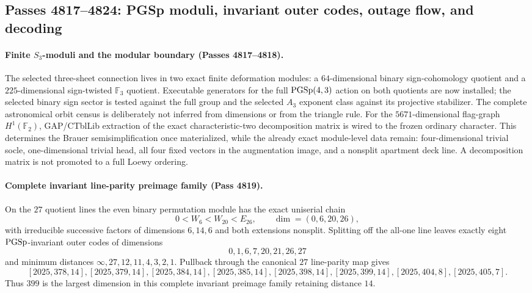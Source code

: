 \subsection*{Passes 4817--4824: PGSp moduli, invariant outer codes, outage flow, and decoding}

\paragraph{Finite $S_3$-moduli and the modular boundary (Passes 4817--4818).}
The selected three-sheet connection lives in two exact finite deformation modules: a $64$-dimensional binary sign-cohomology quotient and a $225$-dimensional sign-twisted $\mathbb F_3$ quotient.  Executable generators for the full $\mathrm{PGSp}(4,3)$ action on both quotients are now installed; the selected binary sign sector is tested against the full group and the selected $A_3$ exponent class against its projective stabilizer.  The complete astronomical orbit census is deliberately not inferred from dimensions or from the triangle rule.  For the $5671$-dimensional flag-graph $H^1(\mathbb F_2)$, GAP/CTblLib extraction of the exact characteristic-two decomposition matrix is wired to the frozen ordinary character.  This determines the Brauer semisimplification once materialized, while the already exact module-level data remain: four-dimensional trivial socle, one-dimensional trivial head, all four fixed vectors in the augmentation image, and a nonsplit apartment deck line.  A decomposition matrix is not promoted to a full Loewy ordering.

\paragraph{Complete invariant line-parity preimage family (Pass 4819).}
On the $27$ quotient lines the even binary permutation module has the exact uniserial chain
\[
0<W_6<W_{20}<E_{26},\qquad \dim=(0,6,20,26),
\]
with irreducible successive factors of dimensions $6,14,6$ and both extensions nonsplit.  Splitting off the all-one line leaves exactly eight $\mathrm{PGSp}$-invariant outer codes of dimensions
\[
0,1,6,7,20,21,26,27
\]
and minimum distances $\infty,27,12,11,4,3,2,1$.  Pullback through the canonical $27$ line-parity map gives
\[
[2025,378,14], [2025,379,14], [2025,384,14], [2025,385,14],
[2025,398,14], \boxed{[2025,399,14]}, [2025,404,8], [2025,405,7].
\]
Thus $399$ is the largest dimension in this complete invariant preimage family retaining distance $14$.

